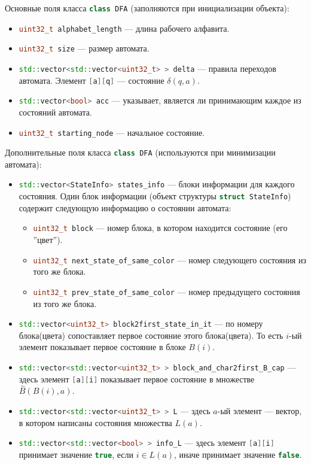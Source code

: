 \documentclass{article}
\begin{document}
Основные поля класса \lstinline[language=C++]!class DFA! (заполняются при инициализации объекта):
\begin{itemize}
  \item \lstinline[language=C++]!uint32_t alphabet_length! --- длина рабочего алфавита.
  \item \lstinline[language=C++]!uint32_t size! --- размер автомата.
  \item \lstinline[language=C++]!std::vector<std::vector<uint32_t> > delta! --- правила переходов автомата. Элемент \lstinline[language=C++]![a][q]! --- состояние $\delta(q, a)$.
  \item \lstinline[language=C++]!std::vector<bool> acc! --- указывает, является ли принимающим каждое из состояний автомата.
  \item \lstinline[language=C++]!uint32_t starting_node! --- начальное состояние.
\end{itemize}
  Дополнительные поля класса \lstinline[language=C++]!class DFA! (используются при минимизации автомата):
\begin{itemize}
    \item \lstinline[language=C++]!std::vector<StateInfo> states_info! --- блоки информации для каждого состояния. Один блок информации (объект структуры \lstinline[language=C++]!struct StateInfo!) содержит следующую информацию о состоянии автомата:
    \begin{itemize}
      \item[\ding{118}] \lstinline[language=C++]!uint32_t block! --- номер блока, в котором находится состояние (его ''цвет'').
      \item[\ding{118}] \lstinline[language=C++]!uint32_t next_state_of_same_color! --- номер следующего состояния из того же блока.
      \item[\ding{118}] \lstinline[language=C++]!uint32_t prev_state_of_same_color! --- номер предыдущего состояния из того же блока.
    \end{itemize}
  
    \item \lstinline[language=C++]!std::vector<uint32_t> block2first_state_in_it! --- по номеру блока(цвета) сопоставляет первое состояние этого блока(цвета). То есть $i$-ый элемент показывает первое состояние в блоке $B(i)$.
  \item \lstinline[language=C++]!std::vector<std::vector<uint32_t> > block_and_char2first_B_cap! --- здесь элемент \lstinline[language=C++]![a][i]! показывает первое состояние в множестве $\hat B(B(i), a)$.
  \item \lstinline[language=C++]!std::vector<std::vector<uint32_t> > L! --- здесь $a$-ый элемент --- вектор, в котором написаны состояния множества $L(a)$.
  \item \lstinline[language=C++]!std::vector<std::vector<bool> > info_L! --- здесь элемент \lstinline[language=C++]![a][i]! принимает значение \lstinline[language=C++]!true!, если $i \in L(a)$, иначе принимает значение \lstinline[language=C++]!false!.
\end{itemize}
\end{document}
